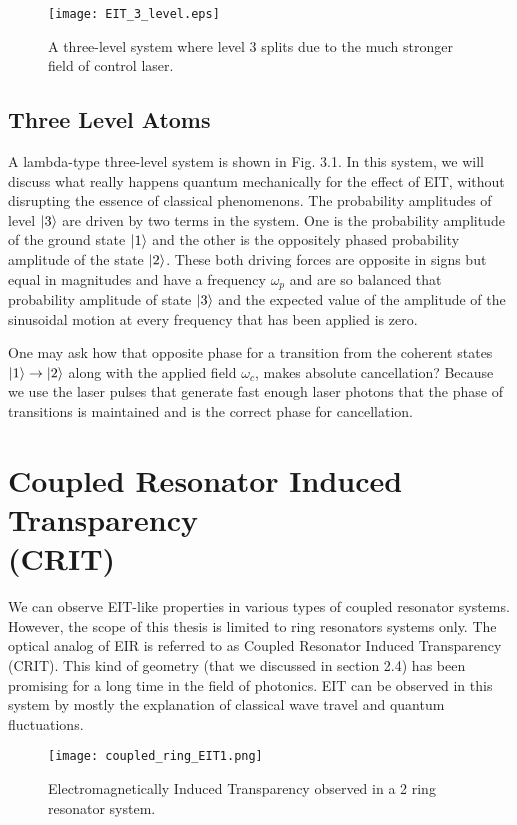 \begin{figure}[h]
\centering
\texttt{[image: EIT\_3\_level.eps]}
\caption{A three-level system where level 3 splits due to the much stronger field of control laser.}
\end{figure}

\subsection{Three Level Atoms}
A lambda-type three-level system is shown in Fig. 3.1. In this system, we will discuss what really happens quantum mechanically for the effect of EIT, without disrupting the essence of classical phenomenons. The probability amplitudes of level $\ket{3}$ are driven by two terms in the system. One is the probability amplitude of the ground state $\ket{1}$ and the other is the oppositely phased probability amplitude of the state $\ket{2}$. These both driving forces are opposite in signs but equal in magnitudes and have a frequency $\omega_{p}$ and are so balanced that probability amplitude of state $\ket{3}$ and the expected value of the amplitude of the sinusoidal motion at every frequency that has been applied is zero. 


One may ask how that opposite phase for a transition from the coherent states $\ket{1} \to \ket{2}$ along with the applied field $\omega_{c}$, makes absolute cancellation? Because we use the laser pulses that generate fast enough laser photons that the phase of transitions is maintained and is the correct phase for cancellation. 


\section{Coupled Resonator Induced Transparency \\ (CRIT)}
We can observe EIT-like properties in various types of coupled resonator systems. However, the scope of this thesis is limited to ring resonators systems only. The optical analog of EIR is referred to as Coupled Resonator Induced Transparency (CRIT). This kind of geometry (that we discussed in section 2.4) has been promising for a long time in the field of photonics. EIT can be observed in this system by mostly the explanation of classical wave travel and quantum fluctuations.

\begin{figure}[h]
\centering
\texttt{[image: coupled\_ring\_EIT1.png]}
\caption{Electromagnetically Induced Transparency observed in a 2 ring resonator system.}
\end{figure}



